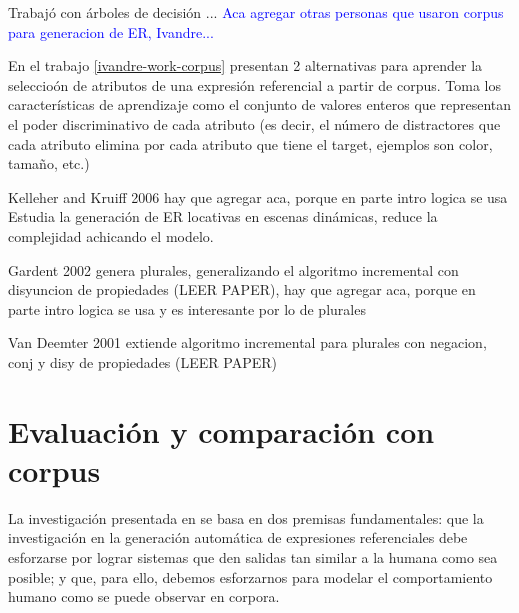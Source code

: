 Trabaj\'o con \'arboles de decisi\'on ...
\textcolor{blue}{Aca agregar otras personas que usaron corpus para generacion de ER, Ivandre... }

En el trabajo \ref{ivandre-work-corpus} presentan 2 alternativas para aprender la seleccio\'on de atributos de una expresi\'on referencial a partir de corpus. Toma los caracter\'isticas de aprendizaje como el conjunto de valores enteros que representan el poder discriminativo de cada atributo (es decir, el n\'umero de distractores que cada atributo elimina por cada atributo que tiene el target, ejemplos son color, tama\~no, etc.) 


Kelleher and Kruiff 2006  hay que agregar aca, porque en parte intro logica se usa
Estudia la generaci\'on de ER locativas en escenas din\'amicas, reduce la complejidad achicando el modelo.


Gardent 2002 genera plurales, generalizando el algoritmo incremental con disyuncion de propiedades (LEER PAPER), hay que agregar aca, porque en parte intro logica se usa y es interesante por lo de plurales

Van Deemter 2001 extiende algoritmo incremental para plurales con negacion, conj y disy de propiedades (LEER PAPER)




\section{Evaluaci\'on y comparaci\'on con corpus}

\label{sec:metricas_evaluacion}

La investigaci\'on presentada en \cite{viethen-phd} se basa en dos premisas fundamentales: que la investigaci\'on
en la generaci\'on autom\'atica de expresiones referenciales debe esforzarse por lograr
sistemas que den salidas tan similar a la humana como sea posible; y que, para ello, debemos
esforzarnos para modelar el comportamiento humano como se puede observar en corpora.


